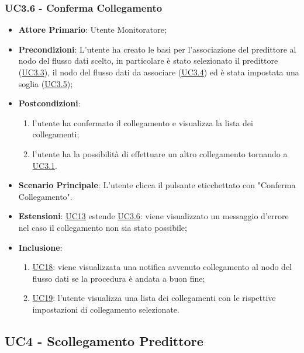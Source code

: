 	\subsubsection{UC3.6 - Conferma Collegamento}
		\begin{itemize}
			\item\textbf{Attore Primario}: Utente Monitoratore;
			\item\textbf{Precondizioni}: L’utente ha creato le basi per l'associazione del predittore al nodo del flusso dati scelto, in particolare è stato selezionato il predittore (\hyperref[par:UC3.3]{UC3.3}), il nodo del flusso dati da associare (\hyperref[par:UC3.4]{UC3.4}) ed è stata impostata una soglia (\hyperref[par:UC3.5]{UC3.5});
			\item\textbf{Postcondizioni}: 
				\begin{enumerate}
					\item l’utente ha confermato il collegamento e visualizza la lista dei collegamenti;
					\item l'utente ha la possibilità di effettuare un altro collegamento tornando a \hyperref[par:UC3.1]{UC3.1}.
				\end{enumerate}
			\item\textbf{Scenario Principale}: L’utente clicca il pulsante eticchettato con "Conferma Collegamento".
			\item\textbf{Estensioni}: \hyperref[par:UC13]{UC13} estende \hyperref[par:UC3.6]{UC3.6}: viene visualizzato un messaggio d’errore nel caso il collegamento non sia stato possibile;
			\item\textbf{Inclusione}: 
				\begin{enumerate}
					\item\hyperref[par:UC18]{UC18}: viene visualizzata una notifica avvenuto collegamento al nodo del flusso dati se la procedura è andata a buon fine;
					\item\hyperref[par:UC19]{UC19}: l'utente visualizza una lista dei collegamenti con le rispettive impostazioni di collegamento selezionate.
				\end{enumerate}
		\end{itemize}

	

	\label{par:UC4}
	\subsection{UC4 - Scollegamento Predittore}

